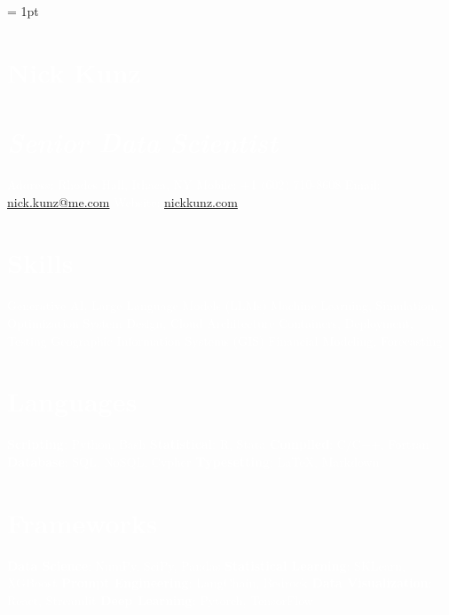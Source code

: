 \documentclass{article}
\author{Nick Kunz}
\begin{document}
\noindent
\scriptsize
{}\font = 1pt
    \begin{bgbox}[
        height = \paperheight,
        width = 0.3\textwidth,
        colback = gray
    ]
        \textcolor{white}{
            \section*{Nick Kunz}
            \section*{\textit{\normalsize{Senior Data Scientist}}}
                Address: \space\space{} Rhodes Hall, Ithaca, NY\newline
                Mobile: \space\space\space\space +1 $($602$)$ 710-8608\newline
                Email: \space\space\space\space\space\space\space\url{nick.kunz@me.com}\newline
                Website: \space\space\space\url{nickkunz.com}
            \section*{Skills}
                Generative AI, Large Language Models (LLMs)\newline
                Machine Learning, Simulation, Optimization\newline
                System Design, Cloud Architecture\newline
                Containers, Deployment, Testing\newline
                Geographic Information Systems (GIS)\newline
                Financial Modeling, Forecasting
            \section*{Languages}
                \textbf{Scripting}: Python, Bash\newline
                \textbf{Statistical}: R, Stata\newline
                \textbf{Compiled}: C/C++, Fortran\newline
                \textbf{Database}: SQL, NoSQL, Cypher\newline
                \textbf{Typesetting}: \LaTeX, Markdown
            \section*{Frameworks}
                \textbf{Data Science}: NumPy, SciPy, Pandas\newline
                \textbf{Statistical Learning}: SKLearn, XGBoost\newline
                \textbf{Prompt Engineering}: LangChain, Bedrock\newline
                \textbf{Data Visualization}: React, Streamlit\newline
                \textbf{Deep Learning}: Pytorch, TensorFlow
}
\end{bgbox}
\end{document}

